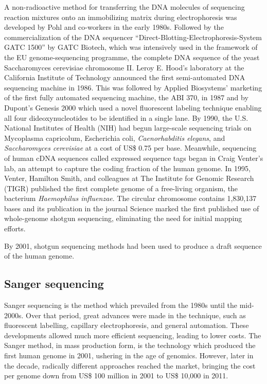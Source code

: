 A non-radioactive method for transferring the DNA molecules of sequencing reaction mixtures onto an immobilizing matrix during electrophoresis was developed by Pohl and co-workers in the early 1980s. Followed by the commercialization of the DNA sequencer ``Direct-Blotting-Electrophoresis-System GATC 1500'' by GATC Biotech, which was intensively used in the framework of the EU genome-sequencing programme, the complete DNA sequence of the yeast Saccharomyces cerevisiae chromosome II. Leroy E. Hood's laboratory at the California Institute of Technology announced the first semi-automated DNA sequencing machine in 1986. This was followed by Applied Biosystems' marketing of the first fully automated sequencing machine, the ABI 370, in 1987 and by Dupont's Genesis 2000 which used a novel fluorescent labeling technique enabling all four dideoxynucleotides to be identified in a single lane. By 1990, the U.S. National Institutes of Health (NIH) had begun large-scale sequencing trials on Mycoplasma capricolum, Escherichia coli, \emph{Caenorhabditis elegans}, and \emph{Saccharomyces cerevisiae} at a cost of US\$ 0.75 per base. Meanwhile, sequencing of human cDNA sequences called expressed sequence tags began in Craig Venter's lab, an attempt to capture the coding fraction of the human genome. In 1995, Venter, Hamilton Smith, and colleagues at The Institute for Genomic Research (TIGR) published the first complete genome of a free-living organism, the bacterium \emph{Haemophilus influenzae}. The circular chromosome contains 1,830,137 bases and its publication in the journal Science marked the first published use of whole-genome shotgun sequencing, eliminating the need for initial mapping efforts.

By 2001, shotgun sequencing methods had been used to produce a draft sequence of the human genome.

\hypertarget{sanger-sequencing}{%
\subsection{Sanger sequencing}\label{sanger-sequencing}}

Sanger sequencing is the method which prevailed from the 1980s until the mid-2000s. Over that period, great advances were made in the technique, such as fluorescent labelling, capillary electrophoresis, and general automation. These developments allowed much more efficient sequencing, leading to lower costs. The Sanger method, in mass production form, is the technology which produced the first human genome in 2001, ushering in the age of genomics. However, later in the decade, radically different approaches reached the market, bringing the cost per genome down from US\$ 100 million in 2001 to US\$ 10,000 in 2011.

